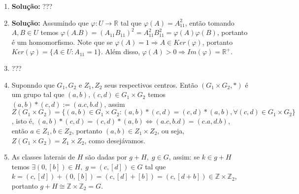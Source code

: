 \documentclass{article}
\begin{document}
\begin{enumerate}
		\item \textbf{Solução:} ???
		
		\item \textbf{Solução:} Assumindo que $\varphi: U \to \mathbb{R}$ tal que $\varphi(A) = A_{11}^{2}$, então tomando $A, B \in U$ temos $\varphi(A.B) = (A_{11}B_{11})^{2} = A_{11}^{2}B_{11}^{2} = \varphi(A)\varphi(B)$, portanto é um homomorfismo. Note que se $\varphi(A)=1 \Rightarrow A \in Ker(\varphi)$, portanto $Ker(\varphi) =\{A \in U: A_{11} = 1\}$. Além disso, $\varphi(A)>0 \Rightarrow Im(\varphi) = \mathbb{R^{+}}$.
		
		\item ???
		
		\item Suponndo que $G_{1}, G_{2}$ e $Z_{1}, Z_{2}$ seus respectivos centros. Então $(G_{1}\times G_{2}, *)$ é um grupo tal que $(a, b), (c, d) \in G_{1}\times G_{2}$ temos $(a,b)*(c,d) := (a.c, b.d)$, assim $Z(G_{1}\times G_{2}) = \{(a, b) \in G_{1}\times G_{2}: (a, b)*(c, d) = (c, d)*(a, b), \forall (c, d) \in G_{1}\times G_{2}\}$, isto é, $(a, b)*(c,d)=(c,d)*(a, b) \iff (a.c, b.d) =(c.a, d.b)$, então $a \in Z_{1}, b \in Z_{2}$, portanto $(a,b) \in Z_{1} \times Z_{2}$, ou seja, $Z(G_{1}\times G_{2}) = Z_{1} \times Z_{2}$, como desejávamos.
		
		\item As classes laterais de $H$ são dadas por $g+H, \; g\in G$, assim: se $k \in g+H$ temos $\exists (0, [b]) \in H, \; g =(c, [d]) \in G$ tal que $k = (c, [d])+(0,[b]) = (c, [d]+[b]) = (c,[d+b]) \in \mathbb{Z} \times \mathbb{Z}_{2}$, portanto $g+H \cong \mathbb{Z} \times \mathbb{Z}_{2} = G$.
		

\end{enumerate}
\end{document}
